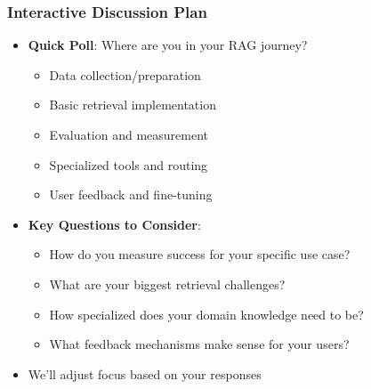 {    \begin{frame}
        \frametitle{Interactive Discussion Plan}
        \begin{itemize}
            \item \textbf{Quick Poll}: Where are you in your RAG journey?
            \begin{itemize}
                \item Data collection/preparation
                \item Basic retrieval implementation
                \item Evaluation and measurement
                \item Specialized tools and routing
                \item User feedback and fine-tuning
            \end{itemize}
            \item \textbf{Key Questions to Consider}:
            \begin{itemize}
                \item How do you measure success for your specific use case?
                \item What are your biggest retrieval challenges?
                \item How specialized does your domain knowledge need to be?
                \item What feedback mechanisms make sense for your users?
            \end{itemize}
            \item We'll adjust focus based on your responses
        \end{itemize}
    \end{frame}
} %